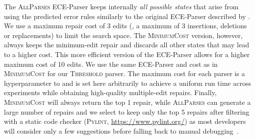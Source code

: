 The \textsc{AllParses} ECE-Parser keeps internally \emph{all possible states}
that arise from using the predicted error rules similarly to the original
ECE-Parser described by \citet{Aho_1972}. We use a maximum repair cost of 3
edits (\ie, a maximum of 3 insertions, deletions or replacements) to limit the
search space. The \textsc{MinimumCost} version, however, always keeps the
minimum-edit repair and discards all other states that may lead to a higher
cost. This more efficient version of the ECE-Parser allows for a higher maximum
cost of 10 edits. We use the same ECE-Parser and cost as in \textsc{MinimumCost}
for our \textsc{Threshold} parser. The maximum cost for each parser is a
hyperparameter to \toolname{} and is set here arbitrarily to achieve a uniform
run time across experiments while obtaining high-quality multiple-edit repairs.
Finally, \textsc{MinimumCost} will always return the top 1 repair, while
\textsc{AllParses} can generate a large number of repairs and we select to keep
only the top 5 repairs after filtering with a static code checker
(\textsc{Pylint}, \url{https://www.pylint.org/}) as most developers will
consider only a few suggestions before falling back to manual
debugging~\citep{Kochhar2016-oc, Parnin2011-ce}.


